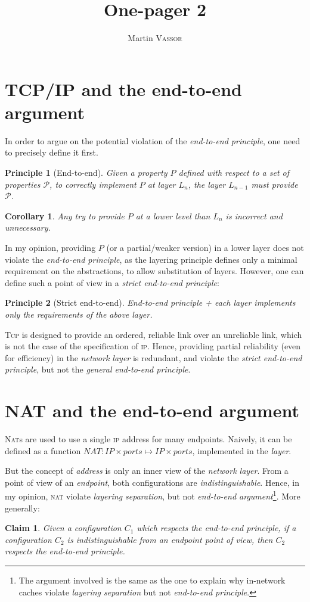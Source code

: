 \documentclass[twocolumn]{article}
\title{One-pager 2}
\author{Martin \textsc{Vassor}}
\date{}
\newtheorem{principle}{Principle}
\newtheorem{corollary}{Corollary}
\newtheorem{claim}{Claim}
\begin{document}
\maketitle
\section{TCP/IP and the end-to-end argument}
In order to argue on the potential violation of the \emph{end-to-end principle}, one need to precisely define it first.  
\begin{principle}[End-to-end]
	Given a property $P$ defined with respect to a set of properties $\mathcal{P}$, to correctly implement $P$ at layer $L_n$, the layer $L_{n-1}$ must provide $\mathcal{P}$.
\end{principle}
\begin{corollary}
Any try to provide $P$ at a lower level than $L_n$ is incorrect and unnecessary.
\end{corollary}
In my opinion, providing $P$ (or a partial/weaker version) in a lower layer does not violate the \emph{end-to-end principle}, as the layering principle defines only a minimal requirement on the abstractions, to allow substitution of layers. However, one can define such a point of view in a \emph{strict end-to-end principle}:
\begin{principle}[Strict end-to-end]
	End-to-end principle + each layer implements only the requirements of the above layer.
\end{principle}

\textsc{Tcp} is designed to provide an ordered, reliable link over an unreliable link, which is not the case of the specification of \textsc{ip}. Hence, providing partial reliability (even for efficiency) in the \emph{network layer} is redundant, and violate the \emph{strict end-to-end principle}, but not the \emph{general end-to-end principle}.

\section{NAT and the end-to-end argument}
\textsc{Nat}s are used to use a single \textsc{ip} address for many endpoints. Naively, it can be defined as a function $NAT: IP\times ports \mapsto IP\times ports$, implemented in the \emph{layer}.

But the concept of \emph{address} is only an inner view of the \emph{network layer}. From a point of view of an \emph{endpoint}, both configurations are \emph{indistinguishable}. Hence, in my opinion, \textsc{nat} violate \emph{layering separation}, but not \emph{end-to-end argument}\footnote{The argument involved is the same as the one to explain why in-network caches violate \emph{layering separation} but not \emph{end-to-end principle}.}. More generally: 
\begin{claim}
	Given a configuration $C_1$ which respects the \emph{end-to-end principle}, if a configuration $C_2$ is \emph{indistinguishable} from an endpoint point of view, then $C_2$ respects the \emph{end-to-end principle}.
\end{claim}
\end{document}
